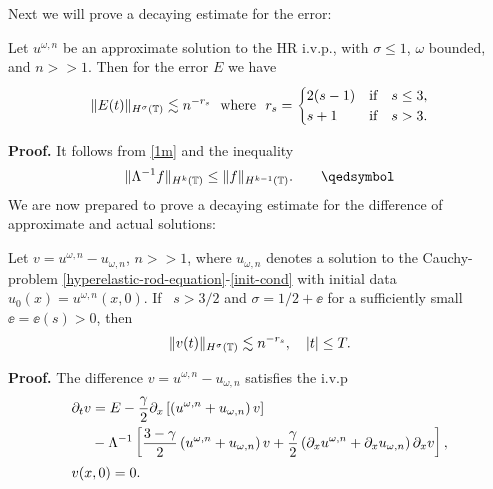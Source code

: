 %
%
%
Next we will prove a decaying estimate for the error:
%
%
%
%
%                      
%
%
%
%
\begin{lemma}
\label{lem:error_of_approx_solution}
Let $u^{\omega,n}$ be an approximate solution to the HR i.v.p., with 
$\sigma \le 1$,  $\omega$ bounded, and $n >> 1$.
Then for the error $E$ we have
%
%
\begin{equation}
\label{total-error-approx-solution}
\begin{split}
\|E(t)\|_{H^\sigma(\mathbb{T})} \lesssim n^{-r_s} \ \ \text{where} \ \ r_s = 
\begin{cases}
2(s-1)   & \text{if} \quad s \le 3,\\  s+1  & \text{if} \quad s > 3. \\
\end{cases}
\end{split}
\end{equation}
%
%
%
%
\end{lemma}
%
%
%
%
%
%
%
\textbf{Proof.} It follows from \eqref{1m} and the inequality
%
%
%
%
\begin{equation*}
\begin{split}
\|\Lambda^{-1}f \|_{H^{k}(\ci)} \le
\|f\|_{H^{k-1}(\ci)}. \qquad \qedsymbol
\end{split}
\end{equation*}
%
%
%
%
%
%
%
%
%
%
We are now prepared to prove a decaying estimate for the difference of 
approximate and actual solutions:
%
%
\begin{proposition}
\label{prop:bound_for_difference-of-approx-actual-soln}
Let $v=u^{\omega,n} - u_{\omega,n}$, $n >>1$,
where $u_{\omega,n}$ denotes a solution to
the Cauchy-problem \eqref{hyperelastic-rod-equation}-\eqref{init-cond} with
initial data $u_0(x) = u^{\omega,n}(x,0)$.
If \ $s > 3/2 $ and $\sigma = 1/2 + \ee$ for a sufficiently
small $\ee = \ee(s) > 0$, then 
%
%
\begin{equation} \label{differ-Hsigma-est} \|
v(t)
\|_{H^\sigma(\mathbb{T})}
\lesssim n^{-r_s}, \quad |t| \le T.
\end{equation}
%
%
\end{proposition}
%
%
\textbf{{Proof.}} The difference $v = u^{\omega,n} - u_{\omega,n}$ satisfies 
the i.v.p
\begin{align}
\label{1.7}
& \p_t v  =  E - \frac{\gamma}{2} \p_x
\left[ \left( u^{\omega,n} + u_{\omega,n} \right)v \right]
\\
\notag & \phantom{\p_t v} - \Lambda^{-1} \left[
\frac{3-\gamma}{2} \left( u^{\omega,n} + u_{\omega,n}
\right) v +
\frac{\gamma}{2}\left( \p_x u^{\omega,n} +
\p_x u_{\omega,n}
\right) \p_x v
\right], \\
& v(x,0)=0.
\end{align}
